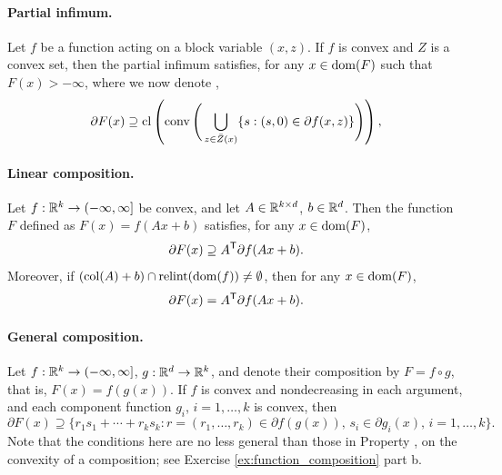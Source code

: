 \paragraph{Partial infimum.}

Let $f$ be a function acting on a block variable $(x,z)$. If $f$ is convex and
$Z$ is a convex set, then the partial infimum  satisfies, for any $x \in \operatorname{dom}(F)$ such that $F(x) > -\infty$,  
where we now denote , 
\[
\partial F(x) \supseteq \operatorname{cl}\left( \operatorname{conv}\Bigg( \bigcup_{z \in \bar{Z}(x)} 
\{ s : (s, 0) \in \partial f(x, z) \} \Bigg)\right),  
\]

\paragraph{Linear composition.}

Let $f : \mathbb{R}^k \to (-\infty, \infty]$ be convex, and let $A \in \mathbb{R}^{k \times d}$,
$b \in \mathbb{R}^d$. Then the function $F$ defined as $F(x) = f(Ax+b)$ satisfies, for 
any $x \in \operatorname{dom}(F)$, 
\[
\partial F(x) \supseteq A^{\mathsf{T}} \partial f(Ax + b).
\]
Moreover, if $(\operatorname{col}(A) + b) \cap \operatorname{relint}(\operatorname{dom}(f)) \not= \emptyset$, then for any  
$x \in \operatorname{dom}(F)$,  
\[
\partial F(x) = A^{\mathsf{T}} \partial f(Ax + b).
\]


\paragraph{General composition.}

Let $f : \mathbb{R}^k \to (-\infty, \infty]$, $g : \mathbb{R}^d \to \mathbb{R}^k$, and denote their
composition by $F = f \circ g$, that is, $F(x) = f(g(x))$. If $f$ is convex and
nondecreasing in each argument, and each component function $g_i$,
$i=1,\ldots,k$ is convex, then  
\[
\partial F(x) \supseteq \{ r_1 s_1 + \cdots + r_k s_k : r = (r_1, \ldots, r_k)
\in \partial f(g(x)), \, s_i \in \partial g_i(x), \, i=1,\ldots,k \big\}.
\]
Note that the conditions here are no less general than those in Property
, on the convexity of a composition; see
Exercise \ref{ex:function_composition} part b.

\medskip

